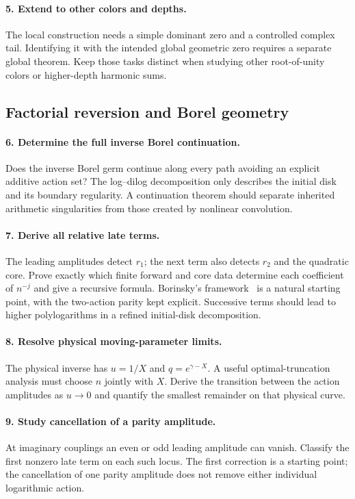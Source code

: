 \paragraph{5. Extend to other colors and depths.}
The local construction needs a simple dominant zero and a controlled
complex tail. Identifying it with the intended global geometric zero
requires a separate global theorem. Keep those tasks distinct when
studying other root-of-unity colors or higher-depth harmonic sums.

\subsection{Factorial reversion and Borel geometry}

\paragraph{6. Determine the full inverse Borel continuation.}
Does the inverse Borel germ continue along every path avoiding an
explicit additive action set? The log--dilog decomposition only
describes the initial disk and its boundary regularity. A continuation
theorem should separate inherited arithmetic singularities from those
created by nonlinear convolution.

\paragraph{7. Derive all relative late terms.}
The leading amplitudes detect $r_1$; the next term also detects
$r_2$ and the quadratic core. Prove exactly which finite forward
and core data determine each coefficient of $n^{-j}$ and give a
recursive formula. Borinsky's framework~\cite{Borinsky} is a
natural starting point, with the two-action parity kept explicit.
Successive terms should lead to higher polylogarithms in a refined
initial-disk decomposition.

\paragraph{8. Resolve physical moving-parameter limits.}
The physical inverse has $u=1/X$ and $q=e^{\gamma-X}$.
A useful optimal-truncation analysis must choose $n$ jointly with
$X$. Derive the transition between the action amplitudes as $u\to0$
and quantify the smallest remainder on that physical curve.

\paragraph{9. Study cancellation of a parity amplitude.}
At imaginary couplings an even or odd leading amplitude can vanish.
Classify the first nonzero late term on each such locus. The
first correction is a starting point; the cancellation of one
parity amplitude does not remove either individual logarithmic action.

